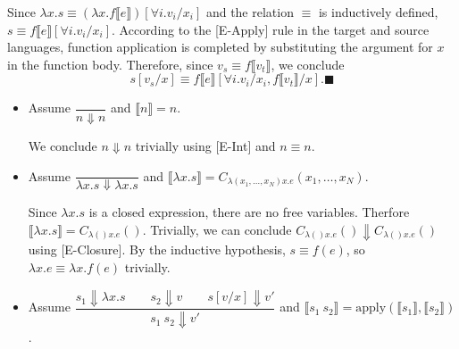 \documentclass[9pt]{article}
\newcommand*{\br}[1]{\llbracket{#1}\rrbracket}
\begin{document}
Since $\lambda x.s \equiv (\lambda x.f\br{e})[\forall i.v_i/x_i]$ and the relation $\equiv$ is inductively defined, $s \equiv f\br{e}[\forall i.v_i/x_i]$. According to the [E-Apply] rule in the target and source languages, function application is completed by substituting the argument for $x$ in the function body. Therefore, since $v_s \equiv f\br{v_t}$, we conclude $$s[v_s/x] \equiv f\br{e}[\forall i.v_i/x_i, f\br{v_t}/x].\blacksquare$$
\begin{itemize}
    \item Assume $\dfrac{}{n \Downarrow n}$ and $\br{n} = n$.
        
        We conclude $n \Downarrow n$ trivially using [E-Int] and $n \equiv n$.

    \item Assume $\dfrac{}{\lambda x.s \Downarrow \lambda x.s}$ and $\br{\lambda x.s} = C_{\lambda (x_1, \dots, x_N)x.e} (x_1, \dots, x_N)$. 

        Since $\lambda x.s$ is a closed expression, there are no free variables. Therfore $\br{\lambda x.s} = C_{\lambda ()x.e}()$. Trivially, we can conclude $C_{\lambda ()x.e}() \Downarrow C_{\lambda ()x.e}()$ using [E-Closure]. By the inductive hypothesis, $s \equiv f(e)$, so $\lambda x.e \equiv \lambda x.f(e)$ trivially.
    \item Assume $\dfrac{s_1 \Downarrow \lambda x.s \qquad s_2 \Downarrow v \qquad s[v/x] \Downarrow v'}{s_1\ s_2 \Downarrow v'}$ and $\br{s_1\ s_2} = \text{apply}(\br{s_1}, \br{s_2})$.

\end{itemize} 
\end{document}

